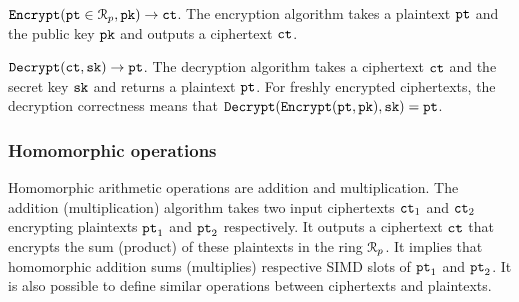 ${\mathtt{Encrypt}}({\mathtt{pt}} \in \mathcal{R}_p, {\mathtt{pk}}) \rightarrow {\mathtt{ct}}$. The encryption algorithm takes a plaintext ${\mathtt{pt}}$ and the public key ${\mathtt{pk}}$ and outputs a ciphertext ${\mathtt{ct}}$.

${\mathtt{Decrypt}}({\mathtt{ct}}, {\mathtt{sk}}) \rightarrow {\mathtt{pt}}$. The decryption algorithm takes a ciphertext ${\mathtt{ct}}$ and the secret key ${\mathtt{sk}}$ and returns a plaintext ${\mathtt{pt}}$.
For freshly encrypted ciphertexts, the decryption correctness means that ${\mathtt{Decrypt}}({\mathtt{Encrypt}}({\mathtt{pt}}, {\mathtt{pk}}), {\mathtt{sk}}) = {\mathtt{pt}}$. 


\subsubsection{Homomorphic operations}

Homomorphic arithmetic operations are addition and multiplication.
The addition (multiplication) algorithm takes two input ciphertexts ${\mathtt{ct}}_1$ and ${\mathtt{ct}}_2$ encrypting plaintexts ${\mathtt{pt}}_1$ and ${\mathtt{pt}}_2$ respectively.
It outputs a ciphertext ${\mathtt{ct}}$ that encrypts the sum (product) of these plaintexts in the ring $\mathcal{R}_p$.
It implies that homomorphic addition sums (multiplies) respective SIMD slots of ${\mathtt{pt}}_1$ and ${\mathtt{pt}}_2$.
It is also possible to define similar operations between ciphertexts and plaintexts.  






